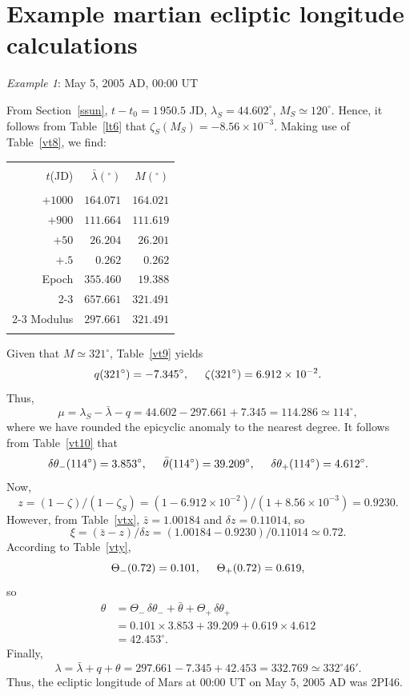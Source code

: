 \section{Example martian ecliptic longitude calculations}
\begin{center}
{\em Example 1}: May 5, 2005 AD, 00:00 UT
\end{center}
From Section~\ref{ssun}, $t-t_0=1\,950.5$ JD, $\lambda_S= 44.602^\circ$, $M_S\simeq 120^\circ$. Hence, it follows from Table~\ref{lt6} that
$\zeta_S(M_S)= -8.56\times 10^{-3}$. Making use of
Table~\ref{vt8}, we find:
\begin{center}
\begin{tabular}{rrr}
&&\\
$t$(JD) & $ \bar{\lambda}(^\circ)$ & $M(^\circ)$\\[-2ex]
&&\\
$+1000$ & $164.071$ & $164.021$\\
$+900$ & $111.664$ & $111.619$\\
$+50$ & $26.204$ & $26.201$\\
$+.5$ & $0.262$ & $0.262$\\
Epoch & $355.460$ & $19.388$\\\cline{2-3}
&$657.661$ & $321.491$\\\cline{2-3}
Modulus & $297.661$ & $321.491$\\ 
&&\\
\end{tabular}
\end{center}
Given that $M\simeq 321^\circ$, Table~\ref{vt9} yields 
$$
q(321^\circ)= -7.345^\circ,\mbox{\hspace{0.5cm}}\zeta(321^\circ)=6.912\times 10^{-2}.
$$
Thus, 
$$
\mu=\lambda_S - \bar{\lambda}-q = 44.602-297.661 + 7.345= 114.286\simeq
114^\circ,
$$
where we have rounded the epicyclic anomaly to the nearest degree. It follows from Table~\ref{vt10}
that 
$$
\delta\theta_-(114^\circ) = 3.853^\circ,\mbox{\hspace{0.5cm}}\bar{\theta}(114^\circ)=39.209^\circ, \mbox{\hspace{0.5cm}}\delta\theta_+(114^\circ) = 4.612^\circ.
$$
Now,
$$ 
z= (1-\zeta)/(1-\zeta_S) = (1-6.912\times 10^{-2})/(1+8.56\times 10^{-3}) =
0.9230.
$$
However, from Table~\ref{vtx}, $\bar{z}= 1.00184$ and $\delta z = 0.11014$,
so
$$
\xi = (\bar{z}-z)/\delta z = (1.00184-0.9230)/0.11014 \simeq 0.72.
$$
According to Table~\ref{vty}, 
$$
\Theta_-(0.72) = 0.101, \mbox{\hspace{0.5cm}}\Theta_+(0.72) = 0.619,
$$
so
\begin{align*}
\theta & = \Theta_-\,\delta\theta_- + \bar{\theta}+\Theta_+\,\delta\theta_+ \\[0.5ex]
&= 0.101\times 3.853+39.209+0.619\times 4.612 \\[0.5ex]
&= 42.453^\circ.
\end{align*}
Finally,
$$
\lambda=\bar{\lambda} + q + \theta= 297.661-7.345+42.453=332.769 \simeq 332^\circ 46'.
$$
Thus,
the ecliptic longitude of Mars at 00:00 UT on May 5, 2005 AD was 2PI46.

